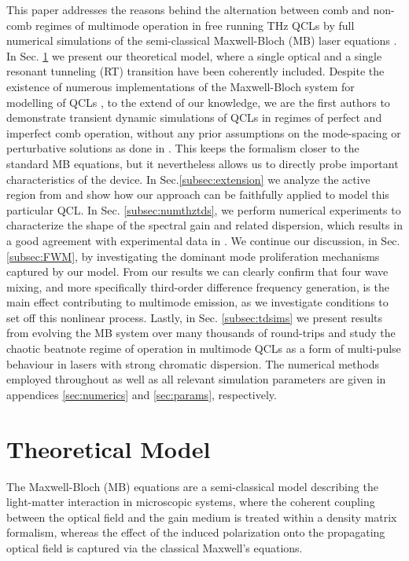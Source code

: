 \documentclass[twocolumn,secnumarabic,amssymb, nobibnotes, aps, prd]{revtex4-1}
\begin{document}
This paper addresses the reasons behind the alternation between comb and non-comb regimes of multimode operation in free running THz QCLs by full numerical simulations of the semi-classical Maxwell-Bloch (MB) laser equations \cite{boyd2003nonlinear}. In Sec. \ref{sec:thmodel} we present our theoretical model, where a single optical and a single resonant tunneling (RT) transition have been coherently included. Despite the existence of numerous implementations of the Maxwell-Bloch system for modelling of QCLs \cite{villares2015quantum,gordon2008multimode,wang2015active,talukder2010self}, to the extend of our knowledge, we are the first authors to demonstrate transient dynamic simulations of QCLs in regimes of perfect and imperfect comb operation, without any prior assumptions on the mode-spacing or perturbative solutions as done in \cite{khurgin2014coherent,villares2015quantum}. This keeps the formalism closer to the standard MB equations, but it nevertheless allows us to directly probe important characteristics of the device. In Sec.\ref{subsec:extension} we analyze the active region from \cite{burghoff2014terahertz} and show how our approach can be faithfully applied to model this particular QCL. In Sec. \ref{subsec:numthztds}, we perform  numerical experiments to characterize the shape of the spectral gain and related dispersion, which results in a good agreement with experimental data in \cite{burghoff2014broadband}. We continue our discussion, in Sec. \ref{subsec:FWM}, by investigating the dominant mode proliferation mechanisms captured by our model. From our results we can clearly confirm that four wave mixing, and more specifically third-order difference frequency generation, is the main effect contributing to multimode emission, as we investigate conditions to set off this nonlinear process. Lastly, in Sec. \ref{subsec:tdsims} we present results from evolving the MB system over many thousands of round-trips and study the chaotic beatnote regime of operation in multimode QCLs as a form of multi-pulse behaviour in lasers with strong chromatic dispersion. The numerical methods employed throughout as well as all relevant simulation parameters are given in appendices \ref{sec:numerics} and \ref{sec:params}, respectively. 

\section{Theoretical Model}
\label{sec:thmodel}

The Maxwell-Bloch (MB) equations are a semi-classical model describing the light-matter interaction in microscopic systems, where the coherent coupling between the optical field and the gain medium is treated within a density matrix formalism, whereas the effect of the induced polarization onto the propagating optical field is captured via the classical Maxwell's equations.
\end{document}
